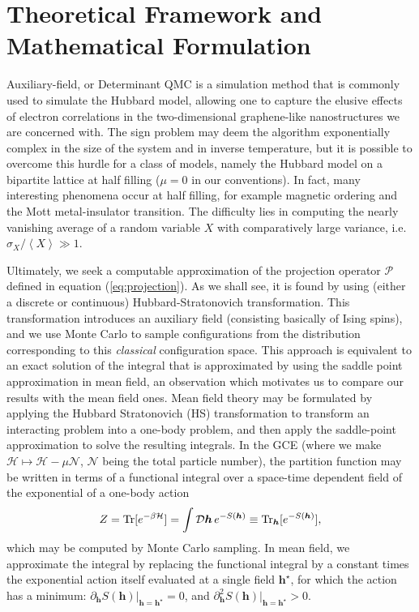 \section{Theoretical Framework and Mathematical Formulation}
\label{sec:matform}

Auxiliary-field, or Determinant \acs{QMC} is a simulation method that is commonly used to simulate the Hubbard model, allowing one to capture the elusive effects of electron correlations in the two-dimensional graphene-like nanostructures we are concerned with.
The sign problem may deem the algorithm exponentially complex in the size of the system and in inverse temperature, but it is possible to overcome this hurdle for a class of models, namely the Hubbard model on a bipartite lattice at half filling ($\mu = 0$ in our conventions).
In fact, many interesting phenomena occur at half filling, for example magnetic ordering and the Mott metal-insulator transition.
The difficulty lies in computing the nearly vanishing average of a random variable $X$ with comparatively large variance, i.e. $\sigma_X / \left\langle X \right\rangle \gg 1$.

Ultimately, we seek a computable approximation of the projection operator $\mathcal{P}$ defined in equation (\ref{eq:projection}).
As we shall see, it is found by using (either a discrete or continuous) Hubbard-Stratonovich transformation.
This transformation introduces an auxiliary field (consisting basically of Ising spins), and we use Monte Carlo to sample configurations from the distribution corresponding to this \emph{classical} configuration space.
This approach is equivalent to an exact solution of the integral that is approximated by using the saddle point approximation in mean field, an observation which motivates us to compare our results with the mean field ones.
Mean field theory may be formulated by applying the Hubbard Stratonovich (HS)  transformation to transform an interacting problem into a one-body problem, and then apply the saddle-point approximation to solve the resulting integrals.
In the \acs{GCE} (where we make $\mathcal{H} \mapsto \mathcal{H} - \mu \mathcal{N}$, $\mathcal{N}$ being the total particle number), the partition function may be written in terms of a functional integral over a space-time dependent field of the exponential of a one-body action
\begin{equation}
Z = \operatorname{Tr} [ e^{-\beta \mathcal{H} } ] = \int \mathcal{D}\bm h \, e^{-S(\bm h) }  \equiv \operatorname{Tr}_{\bm h} [ e^{-S(\bm h)} ],
\end{equation}
which may be computed by Monte Carlo sampling.
In mean field, we approximate the integral by replacing the functional integral by a constant times the exponential action itself evaluated at a single field $\bm h^\star$, for which the action has a minimum: $\partial_{\bm h} S( \bm h ) |_{\bm h = \bm h^\star} = 0$, and $\partial_{\bm h}^2 S( \bm h ) |_{\bm h = \bm h^\star} > 0$.

